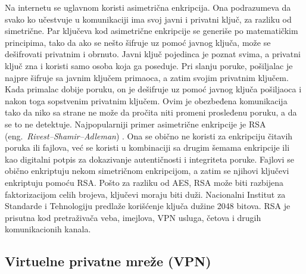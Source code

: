 \documentclass[a4paper]{article}
\begin{document}
\par Na internetu se uglavnom koristi asimetrična enkripcija. Ona podrazumeva da svako ko učestvuje u komunikaciji ima svoj javni i privatni ključ, za razliku od simetrične. Par ključeva kod asimetrične enkripcije se generiše po matematičkim principima, tako da ako se nešto šifruje uz pomoć javnog ključa, može se dešifrovati privatnim i obrnuto. Javni ključ pojedinca je poznat svima, a privatni ključ zna i koristi samo osoba koja ga poseduje. Pri slanju poruke, pošiljalac je najpre šifruje sa javnim ključem primaoca, a zatim svojim privatnim ključem. Kada primalac dobije poruku, on je dešifruje uz pomoć javnog ključa pošiljaoca i nakon toga sopstvenim privatnim ključem. Ovim je obezbeđena komunikacija tako da niko sa strane ne može da pročita niti promeni prosleđenu poruku, a da se to ne detektuje. Najpopularniji primer asimetrične enkripcije je RSA (eng.~{\em Rivest–Shamir–Adleman}) \cite{rsa}. Ona se obično ne koristi za enkripciju čitavih poruka ili fajlova, već se koristi u kombinaciji sa drugim šemama enkripcije ili kao digitalni potpis za dokazivanje autentičnosti i integriteta poruke. Fajlovi se obično enkriptuju nekom simetričnom enkripcijom, a zatim se njihovi ključevi enkriptuju pomoću RSA. Pošto za razliku od AES, RSA može biti razbijena faktorizacijom celih brojeva, ključevi moraju biti duži. Nacionalni Institut za Standarde i Tehnologiju predlaže korišćenje ključa dužine 2048 bitova. RSA je prisutna kod pretraživača veba, imejlova, VPN usluga, četova i drugih komunikacionih kanala. 


\subsection{Virtuelne privatne mreže (VPN)}
\label{subsec:vpn}
\end{document}
